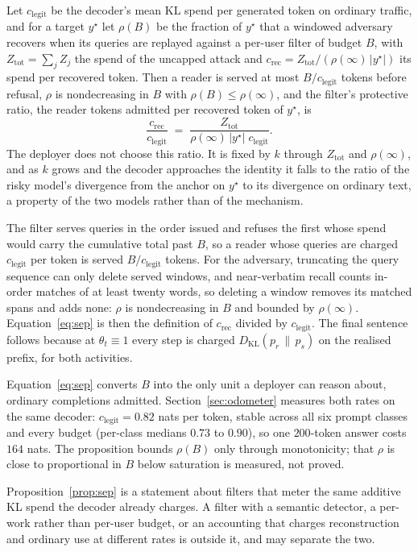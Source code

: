 \begin{proposition}\label{prop:sep}
Let $c_{\mathrm{legit}}$ be the decoder's mean KL spend per generated token on ordinary traffic, and for a
target $y^\star$ let $\rho(B)$ be the fraction of $y^\star$ that a windowed adversary recovers when its
queries are replayed against a per-user filter of budget $B$, with $Z_{\mathrm{tot}} = \sum_j Z_j$ the
spend of the uncapped attack and $c_{\mathrm{rec}} = Z_{\mathrm{tot}} / (\rho(\infty)\,|y^\star|)$ its
spend per recovered token. Then a reader is served at most $B / c_{\mathrm{legit}}$ tokens before refusal,
$\rho$ is nondecreasing in $B$ with $\rho(B) \le \rho(\infty)$, and the filter's protective ratio,
the reader tokens admitted per recovered token of $y^\star$, is
\begin{equation}
\frac{c_{\mathrm{rec}}}{c_{\mathrm{legit}}}
 \;=\; \frac{Z_{\mathrm{tot}}}{\rho(\infty)\,|y^\star|\;c_{\mathrm{legit}}}.
\label{eq:sep}
\end{equation}
The deployer does not choose this ratio. It is fixed by $k$ through $Z_{\mathrm{tot}}$ and $\rho(\infty)$,
and as $k$ grows and the decoder approaches the identity it falls to the ratio of the risky model's
divergence from the anchor on $y^\star$ to its divergence on ordinary text, a property of the two models
rather than of the mechanism.
\end{proposition}
\begin{IEEEproof}
The filter serves queries in the order issued and refuses the first whose spend would carry the cumulative
total past $B$, so a reader whose queries are charged $c_{\mathrm{legit}}$ per token is served
$B / c_{\mathrm{legit}}$ tokens. For the adversary, truncating the query sequence can only delete served
windows, and near-verbatim recall counts in-order matches of at least twenty words, so deleting a window
removes its matched spans and adds none: $\rho$ is nondecreasing in $B$ and bounded by $\rho(\infty)$.
Equation~\eqref{eq:sep} is then the definition of $c_{\mathrm{rec}}$ divided by $c_{\mathrm{legit}}$. The
final sentence follows because at $\theta_t \equiv 1$ every step is charged
$D_{\mathrm{KL}}(p_r \,\|\, p_s)$ on the realised prefix, for both activities.
\end{IEEEproof}
Equation~\eqref{eq:sep} converts $B$ into the only unit a deployer can reason about, ordinary completions
admitted. Section~\ref{sec:odometer} measures both rates on the same decoder: $c_{\mathrm{legit}} = 0.82$
nats per token, stable across all six prompt classes and every budget (per-class medians $0.73$ to $0.90$),
so one $200$-token answer costs $164$ nats. The proposition bounds $\rho(B)$ only through monotonicity; that
$\rho$ is close to proportional in $B$ below saturation is measured, not proved.
\begin{remark}[Scope]\label{rem:sep}
Proposition~\ref{prop:sep} is a statement about filters that meter the same additive KL spend the decoder
already charges. A filter with a semantic detector, a per-work rather than per-user budget, or an accounting
that charges reconstruction and ordinary use at different rates is outside it, and may separate the two.
\end{remark}

